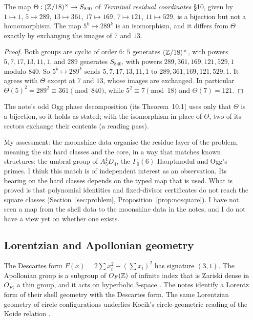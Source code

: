 \begin{proposition}\label{prop:torsor}
The map $\Theta:(\mathbb{Z}/18)^\times\to S_{840}$ of \emph{Terminal residual coordinates} §10, given by $1\mapsto1$, $5\mapsto289$, $13\mapsto361$, $17\mapsto169$, $7\mapsto121$, $11\mapsto529$, is a bijection but not a homomorphism. The map $5^k\mapsto289^k$ is an isomorphism, and it differs from $\Theta$ exactly by exchanging the images of $7$ and $13$.
\end{proposition}
\begin{proof}
Both groups are cyclic of order $6$: $5$ generates $(\mathbb{Z}/18)^\times$, with powers $5,7,17,13,11,1$, and $289$ generates $S_{840}$, with powers $289,361,169,121,529,1$ modulo $840$. So $5^k\mapsto289^k$ sends $5,7,17,13,11,1$ to $289,361,169,121,529,1$. It agrees with $\Theta$ except at $7$ and $13$, whose images are exchanged. In particular $\Theta(5)^2=289^2\equiv361\pmod{840}$, while $5^2\equiv7\pmod{18}$ and $\Theta(7)=121$.
\end{proof}

The note's odd Ogg phase decomposition (its Theorem~10.1) uses only that $\Theta$ is a bijection, so it holds as stated; with the isomorphism in place of $\Theta$, two of its sectors exchange their contents (a reading pass).

My assessment: the moonshine data organise the residue layer of the problem, meaning the six hard classes and the core, in a way that matches known structures: the umbral group of $A_5^4D_4$, the $\Gamma_0(6)$ Hauptmodul and Ogg's primes. I think this match is of independent interest as an observation. Its bearing on the hard classes depends on the typed map that is used. What is proved is that polynomial identities and fixed-divisor certificates do not reach the square classes (Section~\ref{sec:problem}, Proposition~\ref{prop:nosquare}). I have not seen a map from the shell data to the moonshine data in the notes, and I do not have a view yet on whether one exists.

\subsection{Lorentzian and Apollonian geometry}\label{ssec:lorentz}

The Descartes form $F(x)=2\sum x_i^2-(\sum x_i)^2$ has signature $(3,1)$. The Apollonian group is a subgroup of $O_F(\mathbb{Z})$ of infinite index that is Zariski dense in $O_F$, a thin group, and it acts on hyperbolic $3$-space \cite{SarnakLetter,GLMWY}. The notes identify a Lorentz form of their shell geometry with the Descartes form. The same Lorentzian geometry of circle configurations underlies Kocik's circle-geometric reading of the Koide relation \cite{Kocik}.

